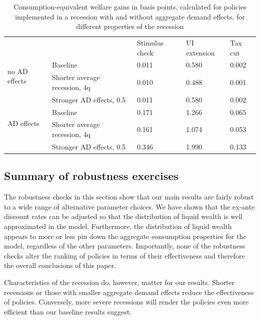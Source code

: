 \documentclass[../HAFiscal]{subfiles}
\begin{document}
\begin{table}[]
	\begin{center}
		\begin{tabular}{@{}lllll@{}}
			\toprule
			&                    											& Stimulus check & UI extension & Tax cut 	\\ \cmidrule(l){1-5}
			\multirow{2}{*}{no AD effects} 					& Baseline 						& 0.011          & 0.580        & 0.002   	\\ 
			& Shorter average recession, 4q & 0.010          & 0.488        & 0.001  	\\
			& Stronger AD effects, 0.5 		& 0.011          & 0.580        & 0.002   	\\ \cmidrule(l){1-5}
			\multirow{2}{*}{AD effects}						& Baseline    					& 0.171          & 1.266        & 0.065   	\\
			& Shorter average recession, 4q & 0.161          & 1.074        & 0.053   	\\
			& Stronger AD effects, 0.5    	& 0.346          & 1.990        & 0.133   	\\ \cmidrule(l){1-5} 
		\end{tabular}
		\caption{Consumption-equivalent welfare gains in basis points, calculated for policies implemented in a recession with and without aggregate demand effects, for different properties of the recession}
		\label{tab:robustness_recession_property_results}
	\end{center}
\end{table}




\FloatBarrier
\subsection{Summary of robustness exercises}
\label{sec:robust_summary}

The robustness checks in this section show that our main results are fairly robust to a wide range of alternative parameter choices. We have shown that the ex-ante discount rates can be adjusted so that the distribution of liquid wealth is well approximated in the model. Furthermore, the distribution of liquid wealth appears to more or less pin down the aggregate consumption properties for the model, regardless of the other parameters. Importantly, none of the robustness checks alter the ranking of policies in terms of their effectiveness and therefore the overall conclusions of this paper.

Characteristics of the recession do, however, matter for our results. Shorter recessions or those with smaller aggregate demand effects reduce the effectiveness of policies. Conversely, more severe recessions will render the policies even more efficient than our baseline results suggest.
\end{document}
